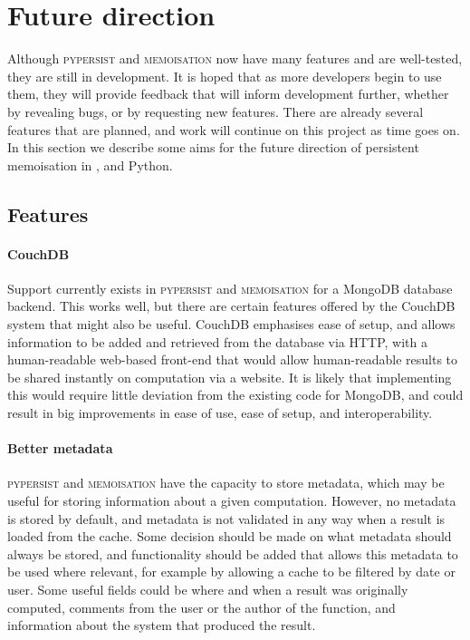 \documentclass{deliverablereport}
\newcommand{\pypersist}{\textsc{pypersist}}
\newcommand{\Memoisation}{\textsc{memoisation}}
\begin{document}
\section{Future direction}
\label{sec:future}

Although \pypersist{} and \Memoisation{} now have many features and are
well-tested, they are still in
development.  It is hoped that as more developers begin to use them, they will
provide feedback that will inform development further, whether by revealing
bugs, or by requesting new features.  There are already several features that
are planned, and work will continue on this project as time goes on.  In this
section we describe some aims for the future direction of persistent memoisation
in \GAP, \Sage and Python.

\subsection{Features}

\paragraph{CouchDB}
Support currently exists in \pypersist{} and \Memoisation{} for a MongoDB database backend.  This
works well, but there are certain features offered by the CouchDB system that
might also be useful.  CouchDB emphasises ease of setup, and allows information
to be added and retrieved from the database via HTTP, with a human-readable
web-based front-end that would allow human-readable results to be shared
instantly on computation via a website.  It is likely that implementing this
would require little deviation from the existing code for MongoDB, and could
result in big improvements in ease of use, ease of setup, and interoperability.

\paragraph{Better metadata}
\pypersist{} and \Memoisation{} have the capacity to store metadata, which may be useful for storing
information about a given computation.  However, no
metadata is stored by default, and metadata is not validated in any way when a
result is loaded from the cache.  Some decision should be made on what metadata
should always be stored, and functionality should be added that allows this
metadata to be used where relevant, for example by allowing a cache to be
filtered by date or user.
Some useful fields could be where and when a result was originally computed,
comments from the user or the author of the function, and information about the
system that produced the result.
\end{document}
